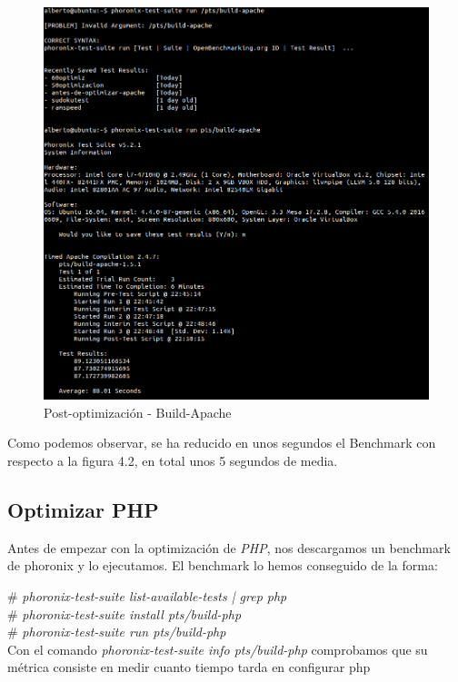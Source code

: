\begin{figure}[h]
	\centering
	\includegraphics[scale=0.45]{images/postTest.png}
	\caption{Post-optimización - Build-Apache}
\end{figure} 

Como podemos observar, se ha reducido en unos segundos el Benchmark con respecto a la figura 4.2, en total unos 5 segundos de media. \\


\newpage
\subsection{Optimizar PHP}

Antes de empezar con la optimización de \textit{PHP}, nos descargamos un benchmark de phoronix y lo ejecutamos. El benchmark lo hemos conseguido de la forma:

\# \textit{phoronix-test-suite list-available-tests | grep php} \\
\# \textit{phoronix-test-suite install pts/build-php} \\
\# \textit{phoronix-test-suite run pts/build-php} \\

Con el comando \textit{phoronix-test-suite info pts/build-php} comprobamos que su métrica consiste en medir cuanto tiempo tarda en configurar php


